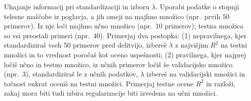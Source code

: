 \begin{exercise}{Uhajanje informacij pri standardizaciji in izboru $\lambda$.}
Uporabi podatke o stopnji telesne maščobe iz poglavja, a jih omeji na majhno množico (npr.\ prvih 50 primerov). Iz nje loči majhno učno množico (npr.\ 10 primerov); testna množica so vsi preostali primeri (npr.\ 40). Primerjaj dva postopka: (1) nepravilnega, kjer standardiziraš vseh 50 primerov pred delitvijo, izbereš $\lambda$ z najvišjim $R^2$ na testni množici in to vrednost poročaš kot oceno uspešnosti; (2) pravilnega, kjer najprej ločiš učno in testno množico, iz učnih primerov ločiš še validacijsko množico (npr.\ 3), standardiziraš le z učnih podatkov, $\lambda$ izbereš na validacijski množici in točnost enkrat oceniš na testni množici. Primerjaj testne ocene $R^2$ in razloži, zakaj mora biti tudi izbira regularizacije biti izvedena na učni množici.
\end{exercise}

